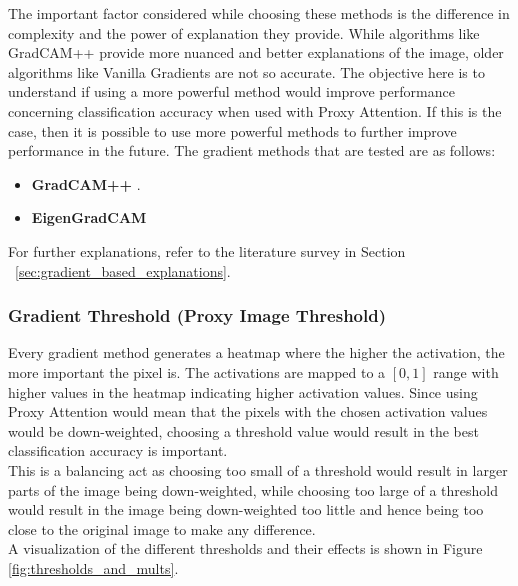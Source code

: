\documentclass[a4paper,11pt,openright]{book}
\begin{document}
The important factor considered while choosing these methods is the difference in complexity and the power of explanation they provide. While algorithms like GradCAM++ \cite{chattopadhayGradCAMGeneralizedGradientBased2018} provide more nuanced and better explanations of the image, older algorithms like Vanilla Gradients \cite{zeilerVisualizingUnderstandingConvolutional2013} are not so accurate. The objective here is to understand if using a more powerful method would improve performance concerning classification accuracy when used with Proxy Attention. If this is the case, then it is possible to use more powerful methods to further improve performance in the future.
The gradient methods that are tested are as follows:
\begin{itemize}
    \item \textbf{GradCAM++} \cite{chattopadhayGradCAMGeneralizedGradientBased2018}.
    \item \textbf{EigenGradCAM} \cite{banymuhammadEigenCAMVisualExplanations2021}
\end{itemize}
For further explanations, refer to the literature survey in Section ~\ref{sec:gradient_based_explanations}.

\subsubsection{Gradient Threshold (Proxy Image Threshold)} \label{sec:grad_threshold}
Every gradient method generates a heatmap where the higher the activation, the more important the pixel is. The activations are mapped to a $[0,1]$ range with higher values in the heatmap indicating higher activation values. Since using Proxy Attention would mean that the pixels with the chosen activation values would be down-weighted, choosing a threshold value would result in the best classification accuracy is important.\\
This is a balancing act as choosing too small of a threshold would result in larger parts of the image being down-weighted, while choosing too large of a threshold would result in the image being down-weighted too little and hence being too close to the original image to make any difference.\\
A visualization of the different thresholds and their effects is shown in Figure \ref{fig:thresholds_and_mults}.
\end{document}
